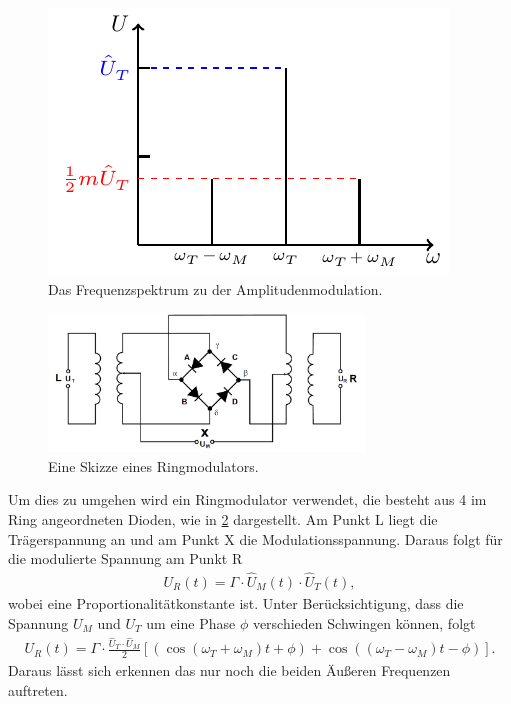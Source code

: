 \begin{figure}
	\centering
	\includegraphics[width =\textwidth/2]{../Grafiken/tikz/tikz-Frequenzspektrum.pdf}
	\caption{Das Frequenzspektrum zu der Amplitudenmodulation.\label{fig:Frequenzspektrum} }
\end{figure}
\newpage
\begin{figure}
	\centering
	\includegraphics[width = 0.75\textwidth]{../Grafiken/Ringmodulator.pdf}
	\caption{Eine Skizze eines Ringmodulators.\cite{V59}\label{fig:Ringmodulator}}
\end{figure}
Um dies zu umgehen wird ein Ringmodulator verwendet, die besteht aus 4 im Ring angeordneten Dioden, wie in \cref{fig:Ringmodulator} dargestellt.
Am Punkt L liegt die Trägerspannung an und am Punkt X die Modulationsspannung.
Daraus folgt für die modulierte Spannung am Punkt R
\begin{align}
	U_R(t)=\Gamma\cdot \hat U_M(t) \cdot\hat U_T(t),
\end{align}
wobei eine Proportionalitätkonstante ist. Unter Berücksichtigung, dass die Spannung $U_M$ und $U_T$ um eine Phase $\phi$ verschieden Schwingen können, folgt
\begin{align}
	U_R(t)=\Gamma\cdot \frac{\hat U_T\cdot\hat U_M}{2}\left[ \left(\cos\left(\omega_T+\omega_M\right)t+\phi\right) +\cos\left(\left(\omega_T-\omega_M\right)t-\phi\right) \right].
\end{align}
Daraus lässt sich erkennen das nur noch die beiden Äußeren Frequenzen auftreten.

